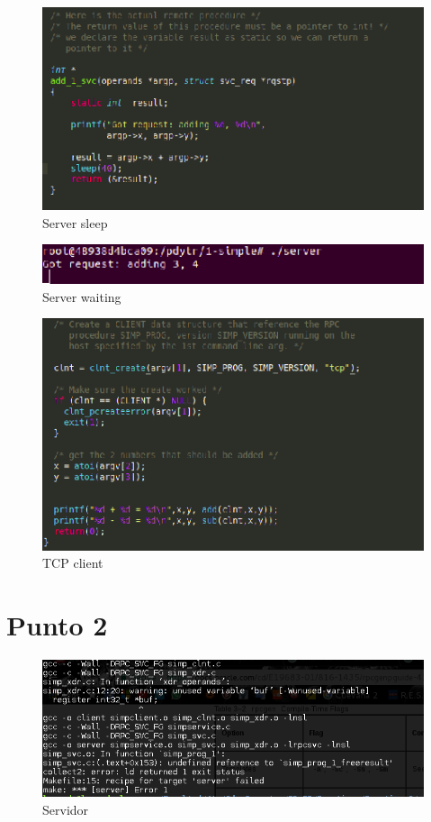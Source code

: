\documentclass[12pt,journal,compsoc]{IEEEtran}
\begin{document}
\begin{figure}[H]
\centering
\includegraphics[width=125mm]{capturas/server-sleep.png}
\caption{Server sleep}
\label{fig:server-sleep}
\end{figure}

\begin{figure}[H]
\centering
\includegraphics[width=125mm]{capturas/server-waiting.png}
\caption{Server waiting}
\label{fig:server-waiting}
\end{figure}

\begin{figure}[H]
\centering
\includegraphics[width=125mm]{capturas/tcp-client.png}
\caption{TCP client}
\label{fig:tcp-client}
\end{figure}


\section{Punto 2}

\begin{figure}[H]
\centering
\includegraphics[width=125mm]{capturas/error-muli.png}
\caption{Servidor}
\label{fig:error-multi}
\end{figure}
\end{document}
